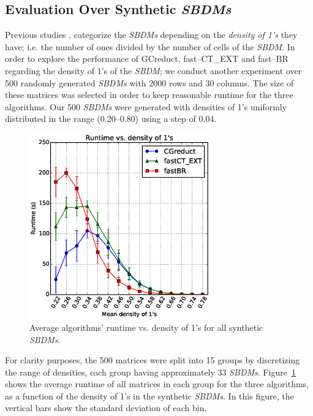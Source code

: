 \documentclass[number,preprint,review,12pt]{elsarticle}
\begin{document}
		
\subsection{Evaluation Over Synthetic \textit{SBDMs}}\label{sub:synth}

	Previous studies \citep{Rojas12,Lias13,Rodriguez15}, categorize the \textit{SBDMs} depending on the \emph{density of 1's} they have; i.e. the number of ones divided by the number of cells of the \textit{SBDM}. In order to explore the performance of GCreduct, fast--CT\_EXT and fast--BR regarding the density of 1's of the \textit{SBDM}; we conduct another experiment over 500 randomly generated \textit{SBDMs} with 2000 rows and 30 columns. The size of these matrices was selected in order to keep reasonable runtime for the three algorithms. Our 500 \textit{SBDMs} were generated with densities of 1's uniformly distributed in the range (0.20--0.80) using a step of 0.04. 
				
	\begin{figure}[htb]
		\begin{center}
			\includegraphics[height=8cm]{overal.eps}
		\end{center}
		\caption{Average algorithms' runtime vs. density of 1's for all synthetic \textit{SBDMs}.}
		\label{fig:scattDensity}
	\end{figure}	

	For clarity purposes, the 500 matrices were split into 15 groups by discretizing the range of densities, each group having approximately 33 \textit{SBDMs}. Figure~\ref{fig:scattDensity} shows the average runtime of all  matrices in each group for the three algorithms, as a function of the density of 1's in the synthetic \textit{SBDMs}. In this figure, the vertical bars show the standard deviation of each bin. 
		
\end{document}
